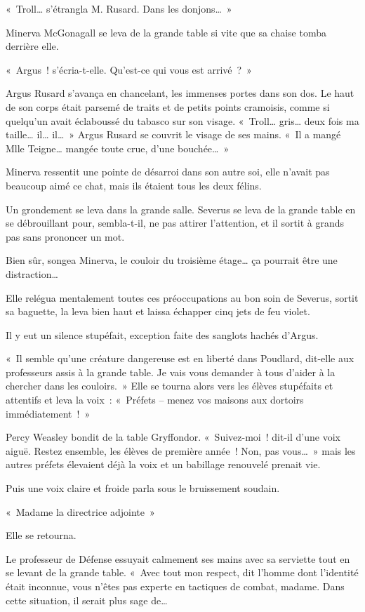 «~Troll… s'étrangla M. Rusard. Dans les donjons…~»

Minerva McGonagall se leva de la grande table si vite que sa chaise tomba derrière elle.

«~Argus~! s'écria-t-elle. Qu'est-ce qui vous est arrivé~?~»

Argus Rusard s'avança en chancelant, les immenses portes dans son dos. Le haut de son corps était parsemé de traits et de petits points cramoisis, comme si quelqu'un avait éclaboussé du tabasco sur son visage. «~Troll… gris… deux fois ma taille… il… il…~» Argus Rusard se couvrit le visage de ses mains. «~Il a mangé Mlle Teigne… mangée toute crue, d'une bouchée…~»

Minerva ressentit une pointe de désarroi dans son autre soi, elle n'avait pas beaucoup aimé ce chat, mais ils étaient tous les deux félins.

Un grondement se leva dans la grande salle. Severus se leva de la grande table en se débrouillant pour, sembla-t-il, ne pas attirer l'attention, et il sortit à grands pas sans prononcer un mot.

Bien sûr, songea Minerva, le couloir du troisième étage… ça pourrait être une distraction…

Elle relégua mentalement toutes ces préoccupations au bon soin de Severus, sortit sa baguette, la leva bien haut et laissa échapper cinq jets de feu violet.

Il y eut un silence stupéfait, exception faite des sanglots hachés d'Argus.

«~Il semble qu'une créature dangereuse est en liberté dans Poudlard, dit-elle aux professeurs assis à la grande table. Je vais vous demander à tous d'aider à la chercher dans les couloirs.~» Elle se tourna alors vers les élèves stupéfaits et attentifs et leva la voix~: «~Préfets -- menez vos maisons aux dortoirs immédiatement~!~»

Percy Weasley bondit de la table Gryffondor. «~Suivez-moi~! dit-il d'une voix aiguë. Restez ensemble, les élèves de première année~! Non, pas vous…~» mais les autres préfets élevaient déjà la voix et un babillage renouvelé prenait vie.

Puis une voix claire et froide parla sous le bruissement soudain.

«~Madame la directrice adjointe~»

Elle se retourna.

Le professeur de Défense essuyait calmement ses mains avec sa serviette tout en se levant de la grande table. «~Avec tout mon respect, dit l'homme dont l'identité était inconnue, vous n'êtes pas experte en tactiques de combat, madame. Dans cette situation, il serait plus sage de…

